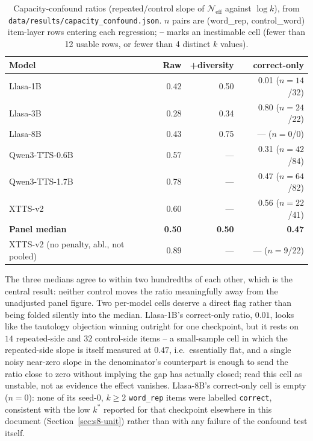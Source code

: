 \documentclass[11pt]{article}
\begin{document}
\begin{table}[h]
\centering
\caption{Capacity-confound ratios (repeated/control slope of
$\mathcal{N}_{\mathrm{eff}}$ against $\log k$), from
\texttt{data/results/capacity\_confound.json}. $n$ pairs are (word\_rep,
control\_word) item-layer rows entering each regression; \texttt{---} marks an
inestimable cell (fewer than 12 usable rows, or fewer than 4 distinct $k$
values).}
\label{tab:capconf}
\small
\begin{tabular}{@{}lrrr@{}}
\toprule
Model & Raw & +diversity & correct-only \\
\midrule
Llasa-1B & 0.42 & 0.50 & 0.01 ($n{=}14$/32) \\
Llasa-3B & 0.28 & 0.34 & 0.80 ($n{=}24$/22) \\
Llasa-8B & 0.43 & 0.75 & --- ($n{=}0$/0) \\
Qwen3-TTS-0.6B & 0.57 & --- & 0.31 ($n{=}42$/84) \\
Qwen3-TTS-1.7B & 0.78 & --- & 0.47 ($n{=}64$/82) \\
XTTS-v2 & 0.60 & --- & 0.56 ($n{=}22$/41) \\
\midrule
\textbf{Panel median} & \textbf{0.50} & \textbf{0.50} & \textbf{0.47} \\
XTTS-v2 (no penalty, abl., not pooled) & 0.89 & --- & --- ($n{=}9$/22) \\
\bottomrule
\end{tabular}
\end{table}

The three medians agree to within two hundredths of each other, which is the
central result: neither control moves the ratio meaningfully away from the
unadjusted panel figure. Two per-model cells deserve a direct flag rather than
being folded silently into the median. Llasa-1B's correct-only ratio, $0.01$,
looks like the tautology objection winning outright for one checkpoint, but it
rests on $14$ repeated-side and $32$ control-side items -- a small-sample cell
in which the repeated-side slope is itself measured at $0.47$, i.e.\
essentially flat, and a single noisy near-zero slope in the denominator's
counterpart is enough to send the ratio close to zero without implying the
gap has actually closed; read this cell as unstable, not as evidence the
effect vanishes. Llasa-8B's correct-only cell is empty ($n{=}0$): none of its
seed-$0$, $k\ge2$ \texttt{word\_rep} items were labelled \texttt{correct},
consistent with the low $k^\ast$ reported for that checkpoint elsewhere in
this document (Section~\ref{sec:s8-unit}) rather than with any failure of the
confound test itself.
\end{document}
